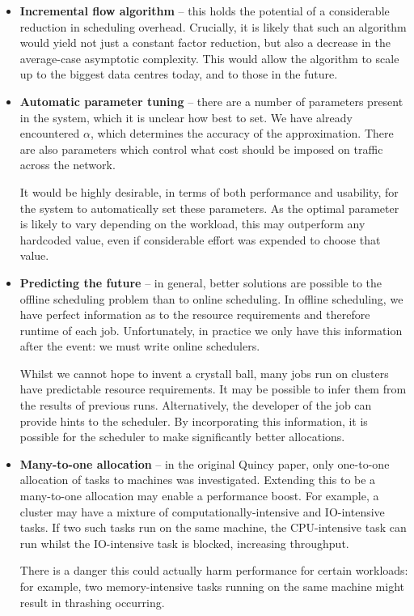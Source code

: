 \begin{itemize}
  \item \textbf{Incremental flow algorithm} -- this holds the potential of a considerable reduction in scheduling overhead. Crucially, it is likely that such an algorithm would yield not just a constant factor reduction, but also a decrease in the average-case asymptotic complexity. This would allow the algorithm to scale up to the biggest data centres today, and to those in the future.
  \item \textbf{Automatic parameter tuning} -- there are a number of parameters present in the system, which it is unclear how best to set. We have already encountered $\alpha$, which determines the accuracy of the approximation. There are also parameters which control what cost should be imposed on traffic across the network.

        It would be highly desirable, in terms of both performance and usability, for the system to automatically set these parameters. As the optimal parameter is likely to vary depending on the workload, this may outperform any hardcoded value, even if considerable effort was expended to choose that value.
  \item \textbf{Predicting the future} -- in general, better solutions are possible to the offline scheduling problem than to online scheduling. In offline scheduling, we have perfect information as to the resource requirements and therefore runtime of each job. Unfortunately, in practice we only have this information after the event: we must write online schedulers.

        Whilst we cannot hope to invent a crystall ball, many jobs run on clusters have predictable resource requirements. It may be possible to infer them from the results of previous runs. Alternatively, the developer of the job can provide hints to the scheduler. By incorporating this information, it is possible for the scheduler to make significantly better allocations. 
  \item \textbf{Many-to-one allocation} -- in the original Quincy paper, only one-to-one allocation of tasks to machines was investigated. Extending this to be a many-to-one allocation may enable a performance boost. For example, a cluster may have a mixture of computationally-intensive and IO-intensive tasks. If two such tasks run on the same machine, the CPU-intensive task can run whilst the IO-intensive task is blocked, increasing throughput.

        There is a danger this could actually harm performance for certain workloads: for example, two memory-intensive tasks running on the same machine might result in thrashing occurring. 


\end{itemize}
